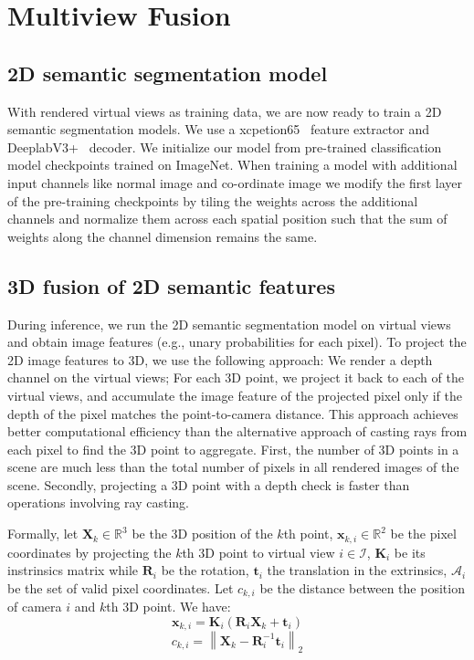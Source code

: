 \documentclass[runningheads]{llncs}
\begin{document}
\section{Multiview Fusion}\label{sec:fusion}

\subsection{2D semantic segmentation model}

With rendered virtual views as training data, we are now ready to train a 2D semantic segmentation models. We use a xcpetion65~\cite{chollet2017xception} feature extractor and DeeplabV3+~\cite{deeplabv3plus2018} decoder. We initialize our model from pre-trained classification model checkpoints trained on ImageNet. When training a model with additional input channels like normal image and co-ordinate image we modify the first layer of the pre-training checkpoints by tiling the weights across the additional channels and normalize them across each spatial position such that the sum of weights along the channel dimension remains the same.

\subsection{3D fusion of 2D semantic features}

During inference, we run the 2D semantic segmentation model on virtual views and obtain image features (e.g., unary probabilities for each pixel). To project the 2D image features to 3D, we use the following approach: We render a depth channel on the virtual views; For each 3D point, we project it back to each of the virtual views, and accumulate the image feature of the projected pixel only if the depth of the pixel matches the point-to-camera distance. This approach achieves better computational efficiency than the alternative approach of casting rays from each pixel to find the 3D point to aggregate. First, the number of 3D points in a scene are much less than the total number of pixels in all rendered images of the scene. Secondly, projecting a 3D point with a depth check is faster than operations involving ray casting.

Formally, let $\mathbf{X}_k\in \mathbb{R}^3$ be the 3D position of the $k$th point, $\mathbf{x}_{k,i}\in \mathbb{R}^2$ be the pixel coordinates by projecting the $k$th 3D point to virtual view $i\in\mathcal{I}$, $\mathbf{K}_i$ be its instrinsics matrix while $\mathbf{R}_i$ be the rotation, $\mathbf{t}_i$ the translation in the extrinsics, $\mathcal{A}_i$ be the set of valid pixel coordinates.  Let $c_{k,i}$ be the distance between the position of camera $i$ and $k$th 3D point. We have:
\begin{equation}
    \mathbf{x}_{k,i} = \mathbf{K}_i(\mathbf{R}_i\mathbf{X}_k + \mathbf{t}_i)
\end{equation}
\begin{equation}
    c_{k, i} = \left\lVert \mathbf{X}_k - \mathbf{R}_i^{-1}\mathbf{t}_i\right\rVert_2
\end{equation}
\end{document}

